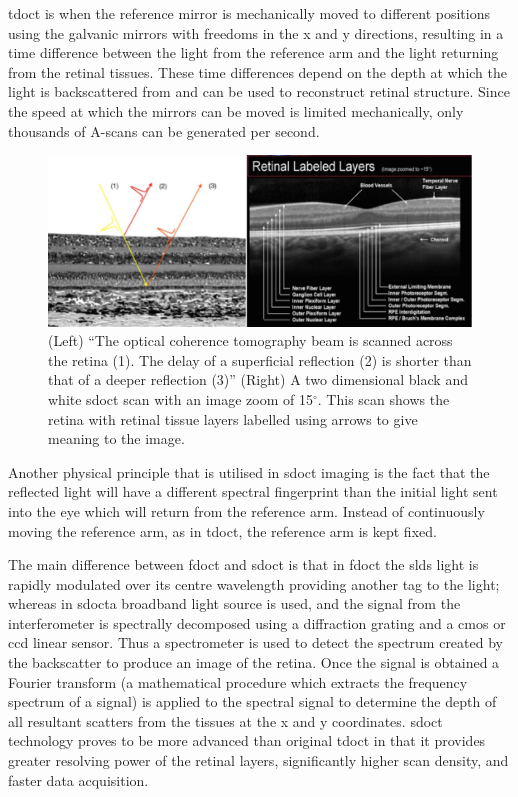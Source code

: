 \Gls{tdoct} is when the reference mirror is mechanically moved to different
positions using the galvanic mirrors with freedoms in the x and y directions,
resulting in a time difference between the light from the reference arm and the
light returning from the retinal tissues.  These time differences depend on the
depth at which the light is backscattered from and can be used to reconstruct
retinal structure.  Since the speed at which the mirrors can be moved is limited
mechanically, only thousands of A-scans can be generated per second.\cite{mbib_4}

\begin{figure}[H]
\centering
\includegraphics[width=14cm]{figures/morgan_4}
\caption{(Left) \enquote{The optical coherence tomography beam is
scanned across the retina (1). The delay of a superficial reflection (2)
is shorter than that of a deeper reflection (3)} (Right) A two
dimensional black and white \Gls{sdoct} scan with an image zoom of
15$^\circ$.\cite{mbib_6}  This scan shows the retina with retinal tissue
layers labelled using arrows to give meaning to the image.\cite{mbib_8}}
\label{fig:m_4}
\end{figure}

Another physical principle that is utilised in \Gls{sdoct} imaging is the
fact that the reflected light will have a different spectral fingerprint than the
initial light sent into the eye which will return from the reference arm.  Instead
of continuously moving the reference arm, as in \Gls{tdoct}, the reference
arm is kept fixed.

The main difference between \Gls{fdoct} and \Gls{sdoct} is that in
\Gls{fdoct} the \Gls{sld}s light is rapidly modulated over its centre wavelength providing
another tag to the light; whereas in \Gls{sdoct}a broadband light source is used,
and the signal from the interferometer is spectrally decomposed using a diffraction
grating and a \Gls{cmos} or \Gls{ccd} linear sensor.\cite{mbib_4}
Thus a spectrometer is used to detect the spectrum created by the backscatter
to produce an image of the retina.  Once the signal is obtained a Fourier transform
(a mathematical procedure which extracts the frequency spectrum of a signal) is
applied to the spectral signal to determine the depth of all resultant scatters from
the tissues at the x and y coordinates.\cite{mbib_4,mbib_9} \Gls{sdoct} technology
proves to be more advanced than original \Gls{tdoct} in that it provides greater
resolving power of the retinal layers, significantly higher scan density, and faster
data acquisition. \cite{mbib_2}

